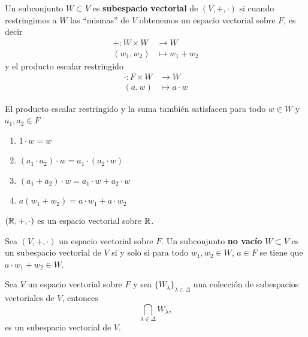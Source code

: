 \documentclass[12pt,a4paper]{book}
\begin{document}
    \begin{definicion}
    \label{def:12}
        Un subconjunto $W\subset V$ es \textbf{subespacio vectorial} de $(V,+,\cdot)$ si
        cuando restringimos a $W$ las \enquote{mismas} de $V$ obtenemos un espacio vectorial sobre $F$,
        es decir
        \begin{align*}
            +:W\times W&\to W\\
            (w_{1},w_{2})&\mapsto w_{1}+w_{2}
        \end{align*}
        y el producto escalar restringido
        \begin{align*}
            \cdot:F\times W&\to W\\
            (a,w)&\mapsto a\cdot w
        \end{align*}
    \end{definicion}

    El producto escalar restringido y la suma también satisfacen para todo $w\in W$ y $a_{1},a_{2}\in F$
    \begin{enumerate}
        \item[(a)] $1\cdot w=w$
        \item[(b)] $(a_{1}\cdot a_{2})\cdot w=a_{1}\cdot(a_{2}\cdot w)$
        \item[(c)] $(a_{1}+a_{2})\cdot w=a_{1}\cdot w+a_{2}\cdot w$
        \item[(d)] $a(w_{1}+w_{2})=a\cdot w_{1}+a\cdot w_{2}$  
    \end{enumerate}

    \begin{ejemplo}
    \label{ej:15}
        $(\mathbb{R},+,\cdot)$ es un espacio vectorial sobre $\mathbb{R}$.
    \end{ejemplo}

    \begin{proposicion}
    \label{prop:14}
        Sea $(V,+,\cdot)$ un espacio vectorial sobre $F$. Un subconjunto \textbf{no vacío}
        $W\subset V$ es un subespacio vectorial de $V$ si y solo si para todo $w_{1},w_{2}\in W$,
        $a\in F$ se tiene que $a\cdot w_{1}+w_{2}\in W$.
    \end{proposicion}

    \vspace{1.5cm}

    \begin{proposicion}
    \label{prop:15}
        Sea $V$ un espacio vectorial sobre $F$ y sea $\{W_{\lambda}\}_{\lambda\in\Delta}$
        una colección de subespacios vectoriales de $V$, entonces
        \begin{equation*}
            \bigcap_{\lambda\in\Delta}W_{\lambda},
        \end{equation*}
        es un subespacio vectorial de $V$.
    \end{proposicion}
\end{document}
